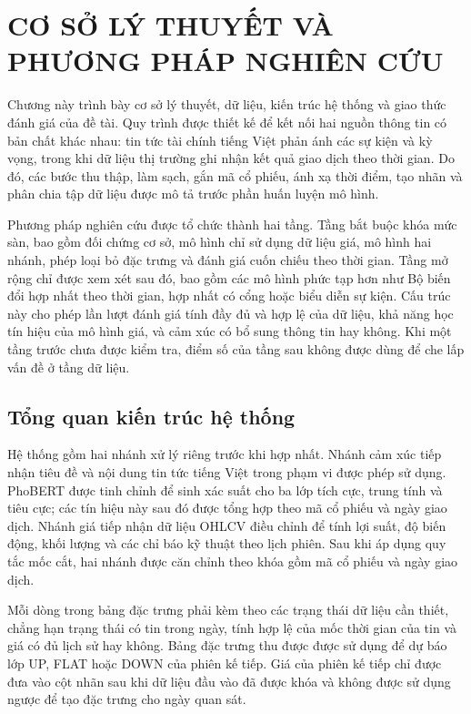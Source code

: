 \documentclass[12pt, a4paper, oneside]{report}
\begin{document}
\chapter{CƠ SỞ LÝ THUYẾT VÀ PHƯƠNG PHÁP NGHIÊN CỨU}
\label{ch:phuong-phap}

Chương này trình bày cơ sở lý thuyết, dữ liệu, kiến trúc hệ thống và giao thức đánh giá của đề tài. Quy trình được thiết kế để kết nối hai nguồn thông tin có bản chất khác nhau: tin tức tài chính tiếng Việt phản ánh các sự kiện và kỳ vọng, trong khi dữ liệu thị trường ghi nhận kết quả giao dịch theo thời gian. Do đó, các bước thu thập, làm sạch, gắn mã cổ phiếu, ánh xạ thời điểm, tạo nhãn và phân chia tập dữ liệu được mô tả trước phần huấn luyện mô hình.

Phương pháp nghiên cứu được tổ chức thành hai tầng. Tầng bắt buộc khóa mức sàn, bao gồm đối chứng cơ sở, mô hình chỉ sử dụng dữ liệu giá, mô hình hai nhánh, phép loại bỏ đặc trưng và đánh giá cuốn chiếu theo thời gian. Tầng mở rộng chỉ được xem xét sau đó, bao gồm các mô hình phức tạp hơn như Bộ biến đổi hợp nhất theo thời gian, hợp nhất có cổng hoặc biểu diễn sự kiện. Cấu trúc này cho phép lần lượt đánh giá tính đầy đủ và hợp lệ của dữ liệu, khả năng học tín hiệu của mô hình giá, và cảm xúc có bổ sung thông tin hay không. Khi một tầng trước chưa được kiểm tra, điểm số của tầng sau không được dùng để che lấp vấn đề ở tầng dữ liệu.
\section{Tổng quan kiến trúc hệ thống}
\label{sec:pp-kien-truc}

Hệ thống gồm hai nhánh xử lý riêng trước khi hợp nhất. Nhánh cảm xúc tiếp nhận tiêu
đề và nội dung tin tức tiếng Việt trong phạm vi được phép sử dụng. PhoBERT được tinh
chỉnh để sinh xác suất cho ba lớp tích cực, trung tính và tiêu cực; các tín hiệu này
sau đó được tổng hợp theo mã cổ phiếu và ngày giao dịch. Nhánh giá tiếp nhận dữ liệu
OHLCV điều chỉnh để tính lợi suất, độ biến động, khối lượng và các chỉ báo kỹ thuật
theo lịch phiên. Sau khi áp dụng quy tắc mốc cắt, hai nhánh được căn chỉnh theo khóa
gồm mã cổ phiếu và ngày giao dịch.

Mỗi dòng trong bảng đặc trưng phải kèm theo các trạng thái dữ liệu cần thiết, chẳng hạn
trạng thái có tin trong ngày, tính hợp lệ của mốc thời gian của tin và giá có đủ lịch sử hay không. Bảng đặc trưng thu được được sử dụng để dự báo lớp UP, FLAT hoặc DOWN
của phiên kế tiếp. Giá của phiên kế tiếp chỉ được đưa vào cột nhãn sau khi dữ liệu đầu
vào đã được khóa và không được sử dụng ngược để tạo đặc trưng cho ngày quan sát.
\end{document}
